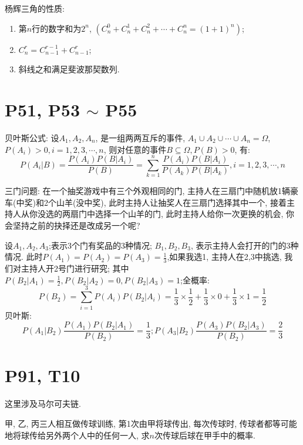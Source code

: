 \documentclass{book}
\begin{document}
    杨辉三角的性质:

    \begin{enumerate}
        \item 第$n$行的数字和为$2^n$, $\left( C_n^0+C_n^1+C_n^2+\cdots+C_n^n=(1+1)^n \right)$;
        \item $C_n^r=C_{n-1}^{r-1}+C_{n-1}^r$;
        \item 斜线之和满足斐波那契数列.
    \end{enumerate}

    \section{\textcolor[rgb]{0.11,0.65,0.52}{P51, P53 $\sim$ P55}}
    贝叶斯公式: 设$A_1,A_2,A_n$, 是一组两两互斥的事件, $A_1\cup A_2\cup \cdots \cup A_n=\Omega$, $P(A_i)>0,i=1,2,3,\cdots,n$, 则对任意的事件$B\subseteq \Omega,P(B)>0$, 有:$$P\left( A_i\Big|B \right)=\frac{P\left( A_i \right)P\left( B\Big|A_i \right)}{P(B)}=\sum_{k=1}^{n} \frac{P(A_i)P(B|A_i)}{P(A_k)P(B \Big |A_k)},i=1,2,3,\cdots,n$$

    \textcolor[rgb]{0.38,0.11,0.2}{三门问题}: 在一个抽奖游戏中有三个外观相同的门, 主持人在三扇门中随机放1辆豪车(中奖)和2个山羊(没中奖), 此时主持人让抽奖人在三扇门选择其中一个, 接着主持人从你没选的两扇门中选择一个山羊的门, 此时主持人给你一次更换的机会, 你会坚持之前的抉择还是改成另一个呢?

    设$A_1,A_2,A_3$;表示3个门有奖品的3种情况; $B_1,B_2,B_3$, 表示主持人会打开的门的3种情况. 此时$\displaystyle P(A_1)=P(A_2)=P(A_3)=\frac{1}{3}$,如果我选1, 主持人在2,3中挑选, 我们对主持人开2号门进行研究; 其中$\displaystyle P\left( B_2\Big|A_1 \right)=\frac{1}{2},P\left( B_2\Big|A_2 \right)=0,P\left( B_2\Big|A_3 \right)=1$;全概率: $$P\left( B_2 \right)=\sum_{i=1}^{3} P(A_i)P\left ( B_2\Big |A_i \right ) =\frac{1}{3}\times \frac{1}{2} +\frac{1}{3}\times 0+\frac{1}{3}\times 1=\frac{1}{2} $$贝叶斯:$$P\left( A_1\Big|B_2 \right)\frac{P(A_1)P\left( B_2\Big|A_1 \right)}{P(B_2)}=\frac{1}{3};P\left( A_3\Big|B_2 \right)\frac{P(A_3)P\left( B_2\Big|A_3 \right)}{P(B_2)}=\frac{2}{3}$$
    \section{\textcolor[rgb]{0.11,0.65,0.52}{P91, T10}}
    这里涉及\textcolor[rgb]{0.38,0.11,0.2}{马尔可夫链}.
    
    \begin{boxB}
        甲, 乙, 丙三人相互做传球训练, 第1次由甲将球传出, 每次传球时, 传球者都等可能地将球传给另外两个人中的任何一人, 求$n$次传球后球在甲手中的概率.
    \end{boxB}
\end{document}
